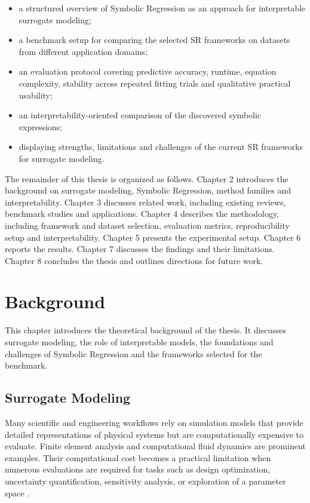 \documentclass[12pt,oneside,bibtotoc,liststotoc]{scrbook}
\begin{document}
\begin{itemize}
    \item a structured overview of Symbolic Regression as an approach for interpretable surrogate modeling;
    \item a benchmark setup for comparing the selected SR frameworks on datasets from different application domains;
    \item an evaluation protocol covering predictive accuracy, runtime, equation complexity, stability across repeated fitting trials and qualitative practical usability;
    \item an interpretability-oriented comparison of the discovered symbolic expressions;
    \item displaying strengths, limitations and challenges of the current SR frameworks for surrogate modeling.
\end{itemize}

The remainder of this thesis is organized as follows. Chapter 2 introduces the background on surrogate modeling, Symbolic Regression, method families and interpretability. Chapter 3 discusses related work, including existing reviews, benchmark studies and applications. Chapter 4 describes the methodology, including framework and dataset selection, evaluation metrics, reproducibility setup and interpretability. Chapter 5 presents the experimental setup. Chapter 6 reports the results. Chapter 7 discusses the findings and their limitations. Chapter 8 concludes the thesis and outlines directions for future work.


\chapter{Background}

This chapter introduces the theoretical background of the thesis. It discusses surrogate modeling, the role of interpretable models, the foundations and challenges of Symbolic Regression and the frameworks selected for the benchmark.

\section{Surrogate Modeling}

Many scientific and engineering workflows rely on simulation models that provide detailed representations of physical systems but are computationally expensive to evaluate. Finite element analysis and computational fluid dynamics are prominent examples. Their computational cost becomes a practical limitation when numerous evaluations are required for tasks such as design optimization, uncertainty quantification, sensitivity analysis, or exploration of a parameter space \cite{alizadeh2020managing}.
\end{document}

